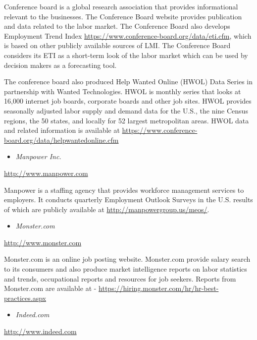 \documentclass[]{book}
\providecommand{\tightlist}{%
  \setlength{\itemsep}{0pt}\setlength{\parskip}{0pt}}
\theoremstyle{definition}
\theoremstyle{definition}
\theoremstyle{definition}
\theoremstyle{remark}
\begin{document}
Conference board is a global research association that provides
informational relevant to the businesses. The Conference Board website
provides publication and data related to the labor market. The
Conference Board also develops Employment Trend Index
\url{https://www.conference-board.org/data/eti.cfm}, which is based on
other publicly available sources of LMI. The Conference Board considers
its ETI as a short-term look of the labor market which can be used by
decision makers as a forecasting tool.

The conference board also produced Help Wanted Online (HWOL) Data Series
in partnership with Wanted Technologies. HWOL is monthly series that
looks at 16,000 internet job boards, corporate boards and other job
sites. HWOL provides seasonally adjusted labor supply and demand data
for the U.S., the nine Census regions, the 50 states, and locally for 52
largest metropolitan areas. HWOL data and related information is
available at
\url{https://www.conference-board.org/data/helpwantedonline.cfm}

\begin{itemize}
\tightlist
\item
  \emph{Manpower Inc.}
\end{itemize}

\url{http://www.manpower.com}

Manpower is a staffing agency that provides workforce management
services to employers. It conducts quarterly Employment Outlook Surveys
in the U.S. results of which are publicly available at
\url{http://manpowergroup.us/meos/}.

\begin{itemize}
\tightlist
\item
  \emph{Monster.com}
\end{itemize}

\url{http://www.monster.com}

Monster.com is an online job posting website. Monster.com provide salary
search to its consumers and also produce market intelligence reports on
labor statistics and trends, occupational reports and resources for job
seekers. Reports from Monster.com are available at -
\url{https://hiring.monster.com/hr/hr-best-practices.aspx}

\begin{itemize}
\tightlist
\item
  \emph{Indeed.com}
\end{itemize}

\url{http://www.indeed.com}
\end{document}
